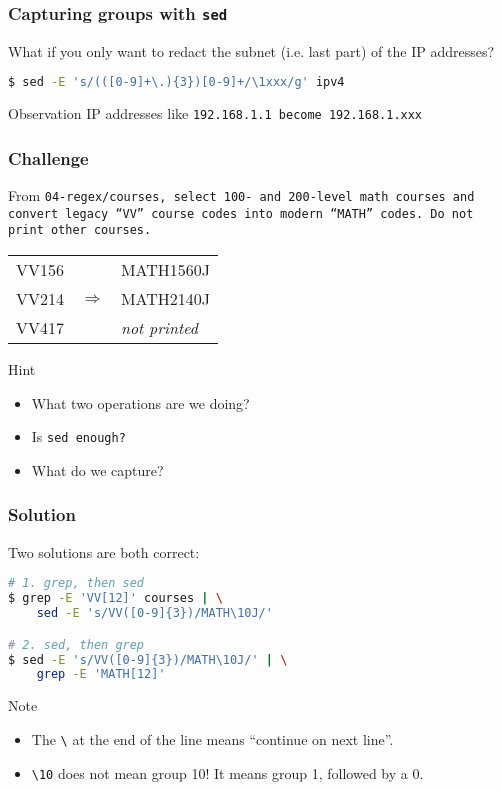 \begin{frame}[fragile]
\frametitle{Capturing groups with \tt{sed}}
What if you only want to redact the subnet (i.e. last part) of the IP addresses?
\begin{lstlisting}[language=bash]
$ sed -E 's/(([0-9]+\.){3})[0-9]+/\1xxx/g' ipv4
\end{lstlisting}
\begin{block}{Observation}
    IP addresses like \tt{192.168.1.1} become \tt{192.168.1.xxx}
\end{block}
\end{frame}

\begin{frame}[fragile]
\frametitle{Challenge}
From \tt{04-regex/courses}, select 100- and 200-level math courses and convert
legacy ``VV'' course codes into modern ``MATH'' codes.
Do not print other courses.
\begin{example}
    \begin{tabular}{lcl}
        VV156 & & MATH1560J \\
        VV214 & $\Longrightarrow$ & MATH2140J \\
        VV417 & & \textit{not printed}
    \end{tabular}
\end{example}
\pause
\begin{block}{Hint}
    \begin{itemize}
        \item What two operations are we doing?
        \item Is \tt{sed} enough?
        \item What do we capture?
    \end{itemize}
\end{block}
\end{frame}

\begin{frame}[fragile]
\frametitle{Solution}
Two solutions are both correct:
\begin{lstlisting}[language=bash]
# 1. grep, then sed
$ grep -E 'VV[12]' courses | \
    sed -E 's/VV([0-9]{3})/MATH\10J/'

# 2. sed, then grep
$ sed -E 's/VV([0-9]{3})/MATH\10J/' | \
    grep -E 'MATH[12]'
\end{lstlisting}
\begin{block}{Note}
    \begin{itemize}
        \item The \verb|\| at the end of the line means ``continue on next
            line''.
        \item \verb|\10| does not mean group 10! It means group 1, followed by
            a 0.
    \end{itemize}
\end{block}
\end{frame}

